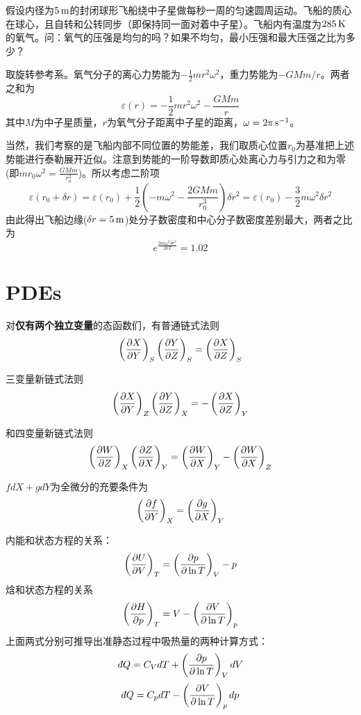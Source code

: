 \documentclass[CJK]{beamer}
\begin{document}
\begin{frame}
  \chtitle{\proid (\sfour)}
  \bch
  假设内径为$5\,\mathrm{m}$的封闭球形飞船绕中子星做每秒一周的匀速圆周运动。飞船的质心在球心，且自转和公转同步（即保持同一面对着中子星）。飞船内有温度为$285\,\mathrm{K}$的氧气。问：氧气的压强是均匀的吗？如果不均匀，最小压强和最大压强之比为多少？
  \ech
\end{frame}

\begin{frame}
  \bch
  {\small
  取旋转参考系。氧气分子的离心力势能为$-\frac{1}{2}mr^2\omega^2$，重力势能为$-GMm/r$。两者之和为
  $$\varepsilon(r) = -\frac{1}{2}mr^2\omega^2 -\frac{GMm}{r}$$
  其中$M$为中子星质量，$r$为氧气分子距离中子星的距离，$\omega = 2\pi \,\mathrm{s}^{-1}$。
  
  当然，我们考察的是飞船内部不同位置的势能差，我们取质心位置$r_0$为基准把上述势能进行泰勒展开近似。注意到势能的一阶导数即质心处离心力与引力之和为零(即$mr_0\omega^2 = \frac{GMm}{r_0^2}$)。所以考虑二阶项
  $$\varepsilon(r_0+\delta r) = \varepsilon(r_0) + \frac{1}{2}\left(-m\omega^2 -\frac{2GMm}{r_0^3}\right)\delta r^2 =  \varepsilon(r_0) - \frac{3}{2}m\omega^2\delta r^2 $$
  由此得出飞船边缘($\delta r = 5\,\mathrm{m}$)处分子数密度和中心分子数密度差别最大，两者之比为
  $$e^{\frac{3m \omega^2\delta r^2}{2kT}}= 1.02 $$
    }
  \ech
\end{frame}


\section{PDEs}
\setcounter{chap}{3}
\setcounter{problem}{0}

\begin{frame}
  \bch
  对{\bf 仅有两个独立变量}的态函数们，有普通链式法则
  $$\left(\frac{\partial X}{\partial Y}\right)_{S} \left(\frac{\partial Y}{\partial Z}\right)_{S} = \left(\frac{\partial X}{\partial Z}\right)_{S}$$

  三变量新链式法则
  $$\left(\frac{\partial X}{\partial Y}\right)_{Z} \left(\frac{\partial Y}{\partial Z}\right)_{X} = -\left(\frac{\partial X}{\partial Z}\right)_{Y}$$

  和四变量新链式法则
  $$ \left(\frac{\partial W}{\partial Z}\right)_{X} \left(\frac{\partial Z}{\partial X}\right)_{Y} = \left(\frac{\partial W}{\partial X}\right)_{Y} - \left(\frac{\partial W}{\partial X}\right)_{Z}  $$
  
  \ech
\end{frame}


\begin{frame}
  \bch
  $ f dX + g dY$为全微分的充要条件为
  $$\left(\frac{\partial f}{\partial Y}\right)_{X} = \left(\frac{\partial g}{\partial X}\right)_{Y} $$
  
  \ech
\end{frame}


\begin{frame}
  \bch
  {\small
  内能和状态方程的关系：
    $$\left(\frac{\partial U}{\partial V}\right)_{T} = \left(\frac{\partial p}{\partial \ln T}\right)_{V} - p $$
  焓和状态方程的关系
  $$\left(\frac{\partial H}{\partial p}\right)_{T} = V - \left(\frac{\partial V}{\partial \ln T}\right)_{p}  $$
  上面两式分别可推导出准静态过程中吸热量的两种计算方式：
    $$ \dbar Q = C_VdT + \pfrac p{\ln T}V dV $$
  $$ \dbar Q = C_pdT - \pfrac V{\ln T}p dp $$  
}
  \ech
\end{frame}
\end{document}
